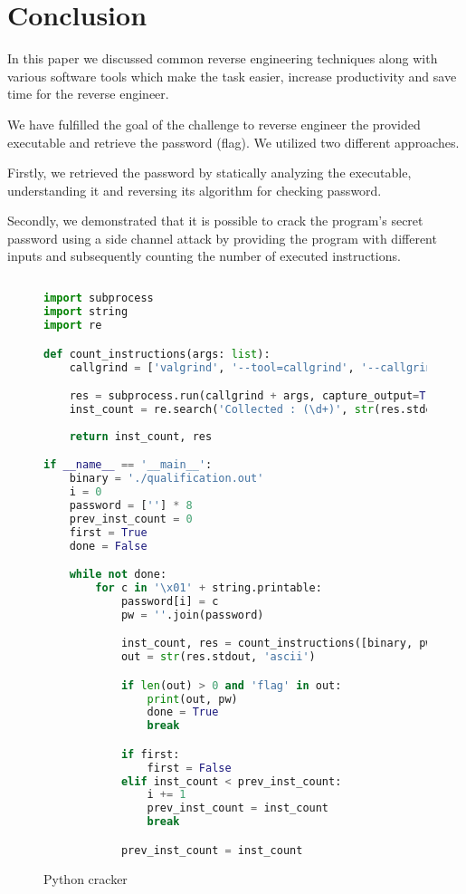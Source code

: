 \documentclass[conference]{IEEEtran}
\begin{document}
%
%

\section{Conclusion}

In this paper we discussed common reverse engineering techniques along with various software tools which make the task easier, increase productivity and save time for the reverse engineer.

We have fulfilled the goal of the challenge to reverse engineer the provided executable and retrieve the password (flag). We utilized two different approaches.

Firstly, we retrieved the password by statically analyzing the executable, understanding it and reversing its algorithm for checking password.

Secondly, we demonstrated that it is possible to crack the program's secret password using a side channel attack by providing the program with different inputs and subsequently counting the number of executed instructions.

\onecolumn
\clearpage
\begin{appendices}
\section{}
\label{apx:python_cracker}
\begin{figure}[ht!]
    \begin{lstlisting}[language=python]
import subprocess
import string
import re

def count_instructions(args: list):
    callgrind = ['valgrind', '--tool=callgrind', '--callgrind-out-file=/dev/null']

    res = subprocess.run(callgrind + args, capture_output=True)
    inst_count = re.search('Collected : (\d+)', str(res.stderr, 'ascii')).group(1)
    
    return inst_count, res

if __name__ == '__main__':
    binary = './qualification.out'
    i = 0
    password = [''] * 8
    prev_inst_count = 0
    first = True
    done = False

    while not done:
        for c in '\x01' + string.printable:
            password[i] = c
            pw = ''.join(password)

            inst_count, res = count_instructions([binary, pw])
            out = str(res.stdout, 'ascii')

            if len(out) > 0 and 'flag' in out:
                print(out, pw)
                done = True
                break

            if first:
                first = False
            elif inst_count < prev_inst_count:
                i += 1
                prev_inst_count = inst_count
                break

            prev_inst_count = inst_count
    \end{lstlisting}
    \caption{Python cracker}
\end{figure}

\end{appendices}
\end{document}
